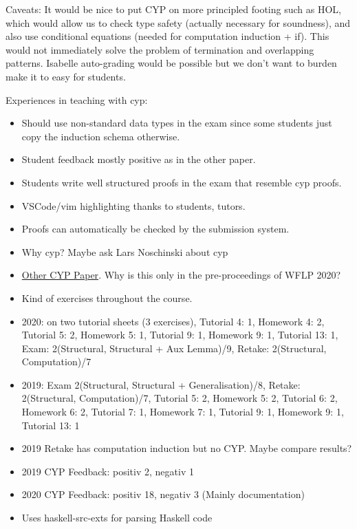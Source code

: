 Caveats:
It would be nice to put CYP on more principled footing such as HOL, which would allow us to check type safety (actually necessary for soundness), and also use conditional equations (needed for computation induction + if).
This would not immediately solve the problem of termination and overlapping patterns.
Isabelle auto-grading would be possible but we don't want to burden make it to easy for students.

Experiences in teaching with cyp:
\begin{itemize}
    \item Should use non-standard data types in the exam since some students just copy the induction schema otherwise.
    \item Student feedback mostly positive as in the other paper. 
    \item Students write well structured proofs in the exam that resemble cyp proofs.
    \item VSCode/vim highlighting thanks to students, tutors.
    \item Proofs can automatically be checked by the submission system.
\end{itemize}

\begin{itemize}
  \item Why cyp? Maybe ask Lars Noschinski about cyp
  \item \href{https://arxiv.org/pdf/2009.01326.pdf}{Other CYP Paper}. Why is this only in the pre-proceedings of WFLP 2020?
  \item Kind of exercises throughout the course.
  \item 2020: on two tutorial sheets (3 exercises), Tutorial 4: 1, Homework 4: 2, Tutorial 5: 2, Homework 5: 1, Tutorial 9: 1, Homework 9: 1, Tutorial 13: 1, Exam: 2(Structural, Structural + Aux Lemma)/9, Retake: 2(Structural, Computation)/7
  \item 2019: Exam 2(Structural, Structural + Generalisation)/8, Retake: 2(Structural, Computation)/7, Tutorial 5: 2, Homework 5: 2, Tutorial 6: 2, Homework 6: 2, Tutorial 7: 1, Homework 7: 1, Tutorial 9: 1, Homework 9: 1, Tutorial 13: 1 
  \item 2019 Retake has computation induction but no CYP. Maybe compare results?
  \item 2019 CYP Feedback: positiv 2, negativ 1 
  \item 2020 CYP Feedback: positiv 18, negativ 3 (Mainly documentation)
  \item Uses haskell-src-exts for parsing Haskell code
\end{itemize}
